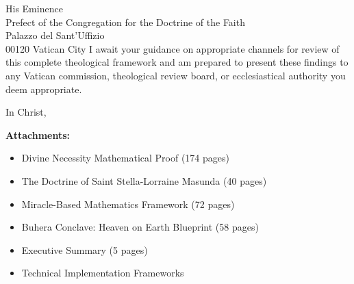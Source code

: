 \documentclass[12pt,letterhead]{letter}
\begin{document}
\begin{letter}{
His Eminence\\
Prefect of the Congregation for the Doctrine of the Faith\\
Palazzo del Sant'Uffizio\\
00120 Vatican City
}
I await your guidance on appropriate channels for review of this complete theological framework and am prepared to present these findings to any Vatican commission, theological review board, or ecclesiastical authority you deem appropriate.

\closing{In Christ,}

\textbf{Attachments:}
\begin{itemize}
\item Divine Necessity Mathematical Proof (174 pages)
\item The Doctrine of Saint Stella-Lorraine Masunda (40 pages)
\item Miracle-Based Mathematics Framework (72 pages)
\item Buhera Conclave: Heaven on Earth Blueprint (58 pages)
\item Executive Summary (5 pages)
\item Technical Implementation Frameworks
\end{itemize}

\end{letter}


\end{document}
